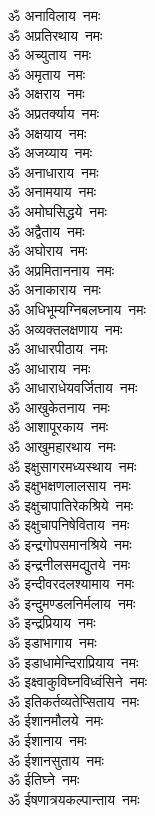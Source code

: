 \begin{multicols}{2}
\begin{flushleft}
ॐ अनाविलाय~नमः\hfill{}\\
ॐ अप्रतिरथाय~नमः\\
ॐ अच्युताय~नमः\\
ॐ अमृताय~नमः\\
ॐ अक्षराय~नमः\\
ॐ अप्रतर्क्याय~नमः\\
ॐ अक्षयाय~नमः\\
ॐ अजय्याय~नमः\\
ॐ अनाधाराय~नमः\\
ॐ अनामयाय~नमः\\
ॐ अमोघसिद्धये~नमः\hfill{}\\
ॐ अद्वैताय~नमः\\
ॐ अघोराय~नमः\\
ॐ अप्रमिताननाय~नमः\\
ॐ अनाकाराय~नमः\\
ॐ अधिभूम्यग्निबलघ्नाय~नमः\\
ॐ अव्यक्तलक्षणाय~नमः\\
ॐ आधारपीठाय~नमः\\
ॐ आधाराय~नमः\\
ॐ आधाराधेयवर्जिताय~नमः\\
ॐ आखुकेतनाय~नमः\hfill{}\\
ॐ आशापूरकाय~नमः\\
ॐ आखुमहारथाय~नमः\\
ॐ इक्षुसागरमध्यस्थाय~नमः\\
ॐ इक्षुभक्षणलालसाय~नमः\\
ॐ इक्षुचापातिरेकश्रिये~नमः\\
ॐ इक्षुचापनिषेविताय~नमः\\
ॐ इन्द्रगोपसमानश्रिये~नमः\\
ॐ इन्द्रनीलसमद्युतये~नमः\\
ॐ इन्दीवरदलश्यामाय~नमः\\
ॐ इन्दुमण्डलनिर्मलाय~नमः\hfill{}\\
ॐ इन्द्रप्रियाय~नमः\\
ॐ इडाभागाय~नमः\\
ॐ इडाधामेन्दिराप्रियाय~नमः\\
ॐ इक्ष्वाकुविघ्नविध्वंसिने~नमः\\
ॐ इतिकर्तव्यतेप्सिताय~नमः\\
ॐ ईशानमौलये~नमः\\
ॐ ईशानाय~नमः\\
ॐ ईशानसुताय~नमः\\
ॐ ईतिघ्ने~नमः\\
ॐ ईषणात्रयकल्पान्ताय~नमः\hfill{}\\

\end{flushleft}
\end{multicols}
